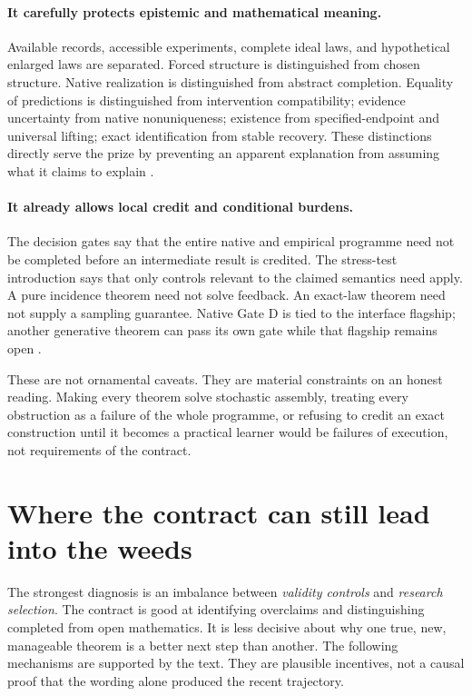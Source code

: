\documentclass[11pt]{article}
\begin{document}
\paragraph{It carefully protects epistemic and mathematical meaning.}
Available records, accessible experiments, complete ideal laws, and hypothetical enlarged laws are separated. Forced structure is distinguished from chosen structure. Native realization is distinguished from abstract completion. Equality of predictions is distinguished from intervention compatibility; evidence uncertainty from native nonuniqueness; existence from specified-endpoint and universal lifting; exact identification from stable recovery. These distinctions directly serve the prize by preventing an apparent explanation from assuming what it claims to explain \cite[sections on relative data, acquisition, and visible assumptions]{Contract}.

\paragraph{It already allows local credit and conditional burdens.}
The decision gates say that the entire native and empirical programme need not be completed before an intermediate result is credited. The stress-test introduction says that only controls relevant to the claimed semantics need apply. A pure incidence theorem need not solve feedback. An exact-law theorem need not supply a sampling guarantee. Native Gate D is tied to the interface flagship; another generative theorem can pass its own gate while that flagship remains open \cite[mandatory stress tests and Gates B--E]{Contract}.

These are not ornamental caveats. They are material constraints on an honest reading. Making every theorem solve stochastic assembly, treating every obstruction as a failure of the whole programme, or refusing to credit an exact construction until it becomes a practical learner would be failures of execution, not requirements of the contract.

\section{Where the contract can still lead into the weeds}
\label{sec:diagnosis}

The strongest diagnosis is an imbalance between \emph{validity controls} and \emph{research selection}. The contract is good at identifying overclaims and distinguishing completed from open mathematics. It is less decisive about why one true, new, manageable theorem is a better next step than another. The following mechanisms are supported by the text. They are plausible incentives, not a causal proof that the wording alone produced the recent trajectory.
\end{document}
